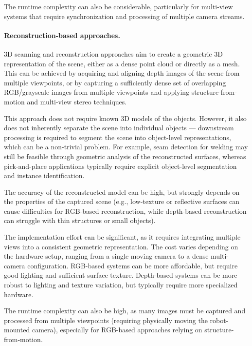 The runtime complexity can also be considerable, particularly for multi-view systems that require synchronization and processing of multiple camera streams.


\paragraph{Reconstruction-based approaches.}
3D scanning and reconstruction approaches aim to create a geometric 3D representation of the scene, either as a dense point cloud or directly as a mesh. This can be achieved by acquiring and aligning depth images of the scene from multiple viewpoints, or by capturing a sufficiently dense set of overlapping RGB/grayscale images from multiple viewpoints and applying structure-from-motion and multi-view stereo techniques.

This approach does not require known 3D models of the objects. However, it also does not inherently separate the scene into individual objects --- downstream processing is required to segment the scene into object-level representations, which can be a non-trivial problem. For example, seam detection for welding may still be feasible through geometric analysis of the reconstructed surfaces, whereas pick-and-place applications typically require explicit object-level segmentation and instance identification.

The accuracy of the reconstructed model can be high, but strongly depends on the properties of the captured scene (e.g., low-texture or reflective surfaces can cause difficulties for RGB-based reconstruction, while depth-based reconstruction can struggle with thin structures or small objects).

The implementation effort can be significant, as it requires integrating multiple views into a consistent geometric representation. The cost varies depending on the hardware setup, ranging from a single moving camera to a dense multi-camera configuration. RGB-based systems can be more affordable, but require good lighting and sufficient surface texture. Depth-based systems can be more robust to lighting and texture variation, but typically require more specialized hardware.

The runtime complexity can also be high, as many images must be captured and processed from multiple viewpoints (requiring physically moving the robot-mounted camera), especially for RGB-based approaches relying on structure-from-motion.

